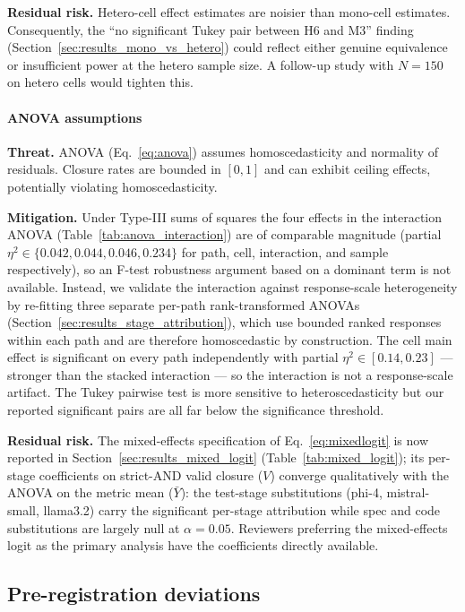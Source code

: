 \textbf{Residual risk.} Hetero-cell effect estimates are noisier than mono-cell estimates. Consequently, the ``no significant Tukey pair between H6 and M3'' finding (Section~\ref{sec:results_mono_vs_hetero}) could reflect either genuine equivalence or insufficient power at the hetero sample size. A follow-up study with $N = 150$ on hetero cells would tighten this.

\paragraph{ANOVA assumptions}

\textbf{Threat.} ANOVA (Eq.~\ref{eq:anova}) assumes homoscedasticity and normality of residuals. Closure rates are bounded in $[0, 1]$ and can exhibit ceiling effects, potentially violating homoscedasticity.

\textbf{Mitigation.} Under Type-III sums of squares the four effects in the interaction ANOVA (Table~\ref{tab:anova_interaction}) are of comparable magnitude (partial $\eta^2 \in \{0.042, 0.044, 0.046, 0.234\}$ for path, cell, interaction, and sample respectively), so an F-test robustness argument based on a dominant term is not available. Instead, we validate the interaction against response-scale heterogeneity by re-fitting three separate per-path rank-transformed ANOVAs (Section~\ref{sec:results_stage_attribution}), which use bounded ranked responses within each path and are therefore homoscedastic by construction. The cell main effect is significant on every path independently with partial $\eta^2 \in [0.14, 0.23]$ --- stronger than the stacked interaction --- so the interaction is not a response-scale artifact. The Tukey pairwise test is more sensitive to heteroscedasticity but our reported significant pairs are all far below the significance threshold.

\textbf{Residual risk.} The mixed-effects specification of Eq.~\ref{eq:mixedlogit} is now reported in Section~\ref{sec:results_mixed_logit} (Table~\ref{tab:mixed_logit}); its per-stage coefficients on strict-AND valid closure ($V$) converge qualitatively with the ANOVA on the metric mean ($\bar{Y}$): the test-stage substitutions (phi-4, mistral-small, llama3.2) carry the significant per-stage attribution while spec and code substitutions are largely null at $\alpha = 0.05$. Reviewers preferring the mixed-effects logit as the primary analysis have the coefficients directly available.

\subsection{Pre-registration deviations}

